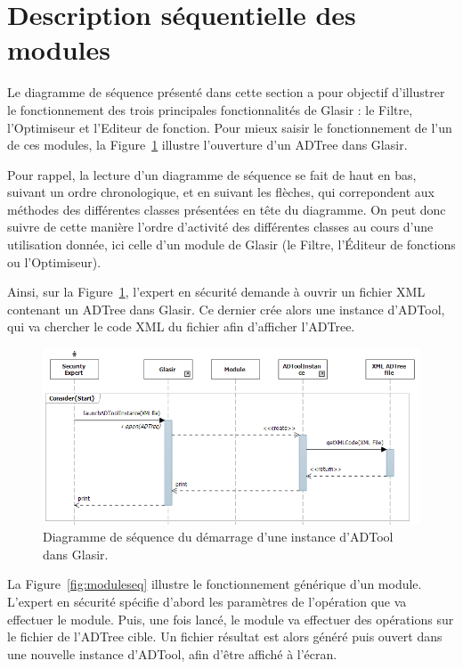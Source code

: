 \section{Description séquentielle des modules}
    \label{sec:modules}
    
Le diagramme de séquence présenté dans cette section a pour objectif d'illustrer le fonctionnement des trois principales fonctionnalités de Glasir : le Filtre, l'Optimiseur et l'Editeur de fonction. Pour mieux saisir le fonctionnement de l'un de ces modules, la {\sc Figure}~{\ref{fig:start}} illustre l'ouverture d'un ADTree dans Glasir.

Pour rappel, la lecture d'un diagramme de séquence se fait de haut en bas, suivant un ordre chronologique, et en suivant les flèches, qui correpondent aux méthodes des différentes classes présentées en tête du diagramme. On peut donc suivre de cette manière l'ordre d'activité des différentes classes au cours d'une utilisation donnée, ici celle d'un module de Glasir (le Filtre, l'Éditeur de fonctions ou l'Optimiseur).

Ainsi, sur la {\sc Figure}~{\ref{fig:start}}, l'expert en sécurité demande à ouvrir un fichier XML contenant un ADTree dans Glasir. Ce dernier crée alors une instance d'ADTool, qui va chercher le code XML du fichier afin d'afficher l'ADTree.

	    \begin{figure}[H]
	        \centering
	        \includegraphics[height=0.5\textwidth]{figure/startseqdiag.png}
	        \caption{Diagramme de séquence du démarrage d'une instance d'ADTool dans Glasir.}
	        \label{fig:start}
	    \end{figure}
	    
	    La {\sc Figure}~{\ref{fig:moduleseq}} illustre le fonctionnement générique d'un module. L'expert en sécurité spécifie d'abord les paramètres de l'opération que va effectuer le module. Puis, une fois lancé, le module va effectuer des opérations sur le fichier de l'ADTree cible. Un fichier résultat est alors généré puis ouvert dans une nouvelle instance d'ADTool, afin d'être affiché à l'écran. 


